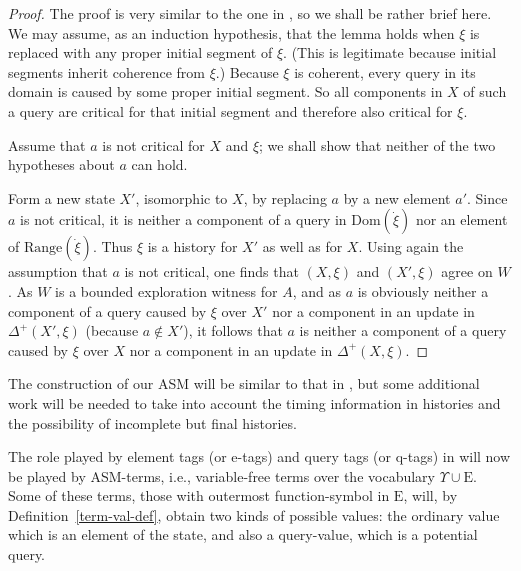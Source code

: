 \documentclass{LMCS}
\theoremstyle{definition}
\newcommand{\DD}{\Delta^+}
\newcommand{\E}{\mathrm{E}}
\newcommand{\U}{\Upsilon}
\newcommand{\ans}{\dot}
\newcommand{\dom}[1]{\ensuremath{{\text{Dom}}(#1)}}
\newcommand{\ran}[1]{\ensuremath{{\text{Range}}(#1)}}
\begin{document}
\begin{proof}
The proof is very similar to the one in \cite[Propositions~5.23 and
5.24]{oa1}, so we shall be rather brief here.
We may assume, as an
induction hypothesis, that the lemma holds when $\xi$ is replaced with
any proper initial segment of $\xi$.  (This is legitimate because
initial segments inherit coherence from $\xi$.)
Because $\xi$ is coherent, every query in its domain is caused by
some proper initial segment.  So all components in $X$ of such a query
are critical for that initial segment and therefore also critical for
$\xi$.

Assume that $a$ is not critical for $X$ and $\xi$; we shall show that
neither of the two hypotheses about $a$ can hold.

Form a new state $X'$, isomorphic to $X$, by replacing $a$ by a new
element $a'$.  Since $a$ is not critical, it is neither a component of
a query in \dom{\ans\xi} nor an element of \ran{\ans\xi}.  Thus $\xi$ is a
history for $X'$ as well as for $X$.  Using again the assumption that
$a$ is not critical, one finds that $(X,\xi)$ and $(X',\xi)$ agree on
$W$.  As $W$ is a bounded exploration witness for $A$, and as $a$ is
obviously neither a component of a query caused by $\xi$ over $X'$ nor
a component in an update in $\DD(X',\xi)$ (because $a\notin X'$), it
follows that $a$ is neither a component of a query caused by $\xi$
over $X$ nor a component in an update in $\DD(X,\xi)$.
\end{proof}

The construction of our ASM will be similar to that in
\cite[Section~5]{oa3}, but some additional work will be needed to
take into account the timing information in histories and the
possibility of incomplete but final histories.

The role played by element tags (or e-tags) and query tags (or q-tags)
in \cite{oa3} will now be played by ASM-terms, i.e., variable-free
terms over the vocabulary $\U \cup \E$. Some of these terms, those
with outermost function-symbol in $\E$, will, by
Definition~\ref{term-val-def}, obtain two kinds of possible values:
the ordinary value which is an element of the state, and also a
query-value, which is a potential query.
\end{document}
